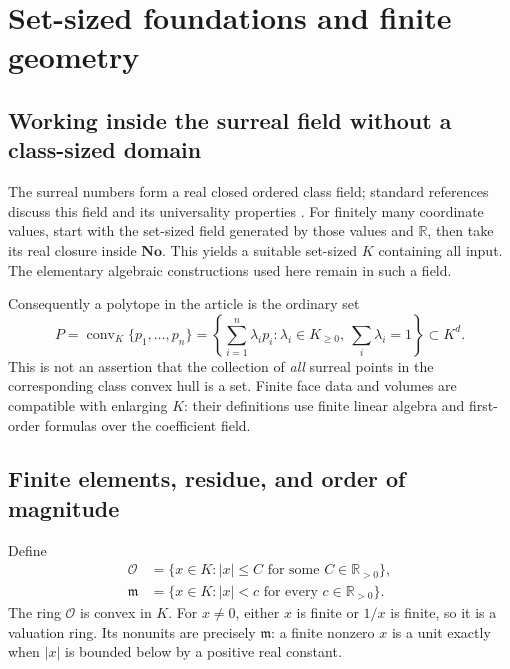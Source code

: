 \documentclass[11pt,a4paper]{article}
\numberwithin{equation}{section}
\theoremstyle{plain}
\newcommand{\No}{\mathbf{No}}
\newcommand{\R}{\mathbb R}
\newcommand{\conv}{\operatorname{conv}}
\newcommand{\OO}{\mathcal O}
\newcommand{\mm}{\mathfrak m}
\begin{document}
\section{Set-sized foundations and finite geometry}
\label{poly:mv:sec:foundations}

\subsection{Working inside the surreal field without a class-sized domain}
The surreal numbers form a real closed ordered class field; standard
references discuss this field and its universality properties
\cite{mv:Ehrlich}. For finitely many coordinate values, start with the
set-sized field generated by those values and $\R$, then take its real
closure inside $\No$. This yields a suitable set-sized $K$ containing all
input. The elementary algebraic constructions used here remain in such a
field.

Consequently a polytope in the article is the ordinary set
\[
 P=\conv_K\{p_1,\ldots,p_n\}
 =\left\{\sum_{i=1}^n\lambda_i p_i:
       \lambda_i\in K_{\ge0},\ \sum_i\lambda_i=1\right\}\subset K^d.
\]
This is not an assertion that the collection of \emph{all} surreal points
in the corresponding class convex hull is a set. Finite face data and
volumes are compatible with enlarging $K$: their definitions use finite
linear algebra and first-order formulas over the coefficient field.

\subsection{Finite elements, residue, and order of magnitude}
Define
\begin{align*}
 \OO&=\{x\in K:|x|\le C\text{ for some }C\in\R_{>0}\},\\
 \mm&=\{x\in K:|x|<c\text{ for every }c\in\R_{>0}\}.
\end{align*}
The ring $\OO$ is convex in $K$. For $x\ne0$, either $x$ is finite or
$1/x$ is finite, so it is a valuation ring. Its nonunits are precisely
$\mm$: a finite nonzero $x$ is a unit exactly when $|x|$ is bounded below
by a positive real constant.
\end{document}
